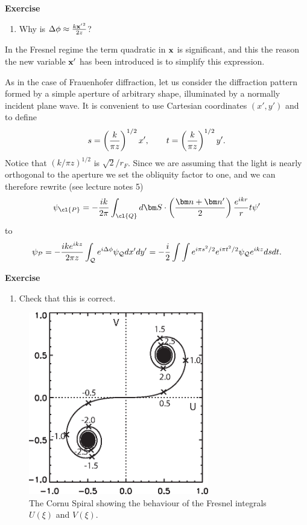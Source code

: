 {\bf Exercise}

\begin{enumerate}
\item Why is $\Delta\phi\approx {k{\bf x'}^2\over 2z}$?
\setcounter{count}{\value{enumi}}
\end{enumerate}

\noindent
In the Fresnel regime the term quadratic in ${\bf x}$ is significant, and
this the reason the new variable ${\bf x'}$ has been introduced is to simplify 
this expression. 

As in the case of Frauenhofer diffraction, let us consider the diffraction pattern formed 
by a simple aperture of arbitrary shape, illuminated by a normally incident
plane wave. It is convenient to use Cartesian coordinates $(x',y')$ and to 
define
\[
s=\left({k\over\pi z}\right)^{1/2}x',\qquad t=\left({k\over\pi z}\right)^{1/2}y'.
\]
\noindent
Notice that $(k/\pi z)^{1/2}$ is $\sqrt{2}/r_{F}$. Since we are assuming that the light is
nearly  orthogonal to the aperture we set the obliquity factor to one, and we can therefore rewrite (see lecture notes 5)
\[
\psi_\cl{P}=-{ik\over 2\pi}\int_\cl{Q}d{\bm S}\cdot\left({{\bm n}+{\bm n'}\over 2}\right){e^{ikr}\over r}t\psi'
\label{eq:small-aperture}
\]
to
\[
\psi_{\cal P}=-{ike^{ikz}\over 2\pi z}\int_{\cal Q}e^{i\Delta\phi}\psi_{\cal Q}dx'dy'
=-{i\over 2}\int\int e^{i\pi s^2/2}e^{i\pi t^2/2}\psi_{\cal Q}e^{ikz}dsdt.
\]

{\bf Exercise}

\begin{enumerate}
\setcounter{enumi}{\value{count}}
\item Check that this is correct. 
\setcounter{count}{\value{enumi}}
\end{enumerate}

\begin{figure}[th!]
	\centering
	\includegraphics[width=0.7\textwidth]{cornu.eps}
  \caption{The Cornu Spiral showing the behaviour of the Fresnel integrals
$U(\xi)$ and $V(\xi)$. }
  \label{fig:cornu}
\end{figure}

